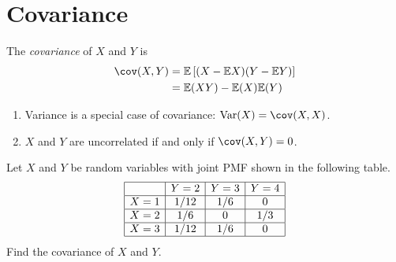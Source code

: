 \documentclass[lecture]{csm}
\newcommand{\expe}{\mathbb{E}}
\newcommand{\var}{\text{Var}}
\def\it{\item}
\def\ben{\begin{enumerate}}
\def\een{\end{enumerate}}
\begin{document}
\section{Covariance}

\begin{definition}
The \emph{covariance} of $X$ and $Y$ is 
\begin{align*}
\cov(X,Y) 
	& = \expe\left[(X-\expe X)(Y-\expe Y)\right]  \\
	& = \expe(XY) - \expe(X)\expe(Y)
\end{align*}
\end{definition}

\begin{remark}
\ben
\it Variance is a special case of covariance: $\var(X) = \cov(X,X)$.
\it $X$ and $Y$ are uncorrelated if and only if $\cov(X,Y)=0$. 
\een
\end{remark}

\newpage

\begin{example}
Let $X$ and $Y$ be random variables with joint PMF shown in the following table. 
\small
\[\begin{array}{|c|c|c|c|}\hline
	& Y=2	& Y=3	& Y=4	\\ \hline
X=1	& 1/12	& 1/6	& 0 		\\ \hline
X=2	& 1/6	& 0		& 1/3 	\\ \hline
X=3	& 1/12	& 1/6  	& 0		\\ \hline
\end{array}\]
\normalsize
Find the covariance of $X$ and $Y$.
\end{example}
\end{document}
